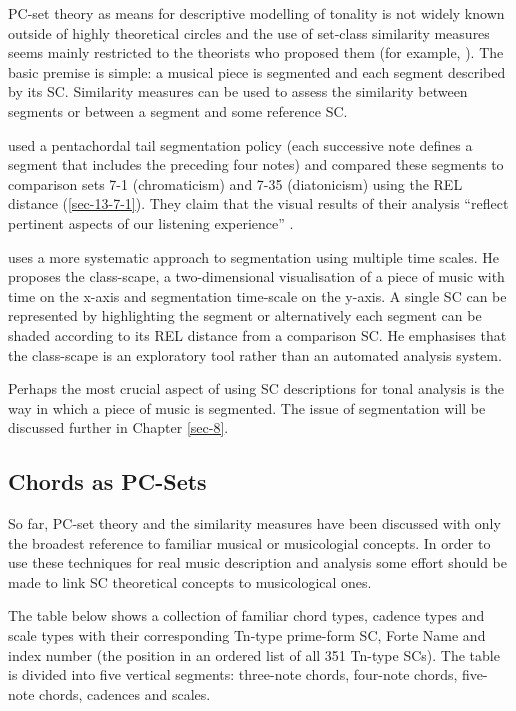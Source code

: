 \documentclass{article}
\begin{document}
PC-set theory as means for descriptive modelling of tonality is not
widely known outside of highly theoretical circles and the use of
set-class similarity measures seems mainly restricted to the theorists
who proposed them (for example, \citealt{Isaacson1996}). The basic
premise is simple: a musical piece is segmented and each segment
described by its SC. Similarity measures can be used to assess the
similarity between segments or between a segment and some reference
SC.

\citet{Huovinen2007} used a pentachordal tail segmentation policy
(each successive note defines a segment that includes the preceding
four notes) and compared these segments to comparison sets 7-1
(chromaticism) and 7-35 (diatonicism) using the REL distance
(\ref{sec-13-7-1}). They claim that the visual results of their analysis ``reflect
pertinent aspects of our listening experience''
\citep[pp. 204]{Huovinen}.

\citet[chap. 5.3]{Martorell2013} uses a more systematic approach to
segmentation using multiple time scales. He proposes the class-scape,
a two-dimensional visualisation of a piece of music with time on the
x-axis and segmentation time-scale on the y-axis. A single SC can be
represented by highlighting the segment or alternatively each segment
can be shaded according to its REL distance from a comparison SC. He
emphasises that the class-scape is an exploratory tool rather than an
automated analysis system.

Perhaps the most crucial aspect of using SC descriptions for tonal
analysis is the way in which a piece of music is segmented. The issue
of segmentation will be discussed further in Chapter \ref{sec-8}.
\subsection{Chords as PC-Sets}
\label{sec-3-7}

So far, PC-set theory and the similarity measures have been discussed
with only the broadest reference to familiar musical or musicologial
concepts. In order to use these techniques for real music description
and analysis some effort should be made to link SC theoretical
concepts to musicological ones.

The table below shows a collection of familiar chord types, cadence
types and scale types with their corresponding Tn-type prime-form SC,
Forte Name and index number (the position in an ordered list of all
351 Tn-type SCs). The table is divided into five vertical segments:
three-note chords, four-note chords, five-note chords, cadences and
scales.
\end{document}

